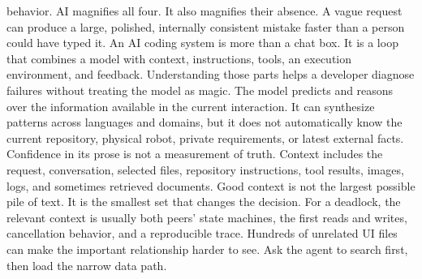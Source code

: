{}behavior.\markdownRendererOlItemEnd 
\markdownRendererOlEnd \markdownRendererInterblockSeparator
{}AI magnifies all four. It also magnifies their absence. A vague request can\markdownRendererSoftLineBreak
{}produce a large, polished, internally consistent mistake faster than a person\markdownRendererSoftLineBreak
{}could have typed it.\markdownRendererInterblockSeparator
{}\markdownRendererThematicBreak{}\markdownRendererInterblockSeparator
{}
\markdownRendererSectionEnd 
\markdownRendererSectionEnd \markdownRendererSectionBegin
{}\markdownRendererInterblockSeparator
{}An AI coding system is more than a chat box. It is a loop that combines a model\markdownRendererSoftLineBreak
{}with context, instructions, tools, an execution environment, and feedback.\markdownRendererSoftLineBreak
{}Understanding those parts helps a developer diagnose failures without treating\markdownRendererSoftLineBreak
{}the model as magic.\markdownRendererInterblockSeparator
{}\markdownRendererSectionBegin
{}\markdownRendererInterblockSeparator
{}The model predicts and reasons over the information available in the current\markdownRendererSoftLineBreak
{}interaction. It can synthesize patterns across languages and domains, but it\markdownRendererSoftLineBreak
{}does not automatically know the current repository, physical robot, private\markdownRendererSoftLineBreak
{}requirements, or latest external facts. Confidence in its prose is not a\markdownRendererSoftLineBreak
{}measurement of truth.\markdownRendererInterblockSeparator
{}
\markdownRendererSectionEnd \markdownRendererSectionBegin
{}\markdownRendererInterblockSeparator
{}Context includes the request, conversation, selected files, repository\markdownRendererSoftLineBreak
{}instructions, tool results, images, logs, and sometimes retrieved documents.\markdownRendererSoftLineBreak
{}Good context is not the largest possible pile of text. It is the smallest set\markdownRendererSoftLineBreak
{}that changes the decision.\markdownRendererParagraphSeparator
{}For a deadlock, the relevant context is usually both peers' state machines,\markdownRendererSoftLineBreak
{}the first reads and writes, cancellation behavior, and a reproducible trace.\markdownRendererSoftLineBreak
{}Hundreds of unrelated UI files can make the important relationship harder to\markdownRendererSoftLineBreak
{}see. Ask the agent to search first, then load the narrow data path.\markdownRendererInterblockSeparator
{}
\markdownRendererSectionEnd \markdownRendererSectionBegin
